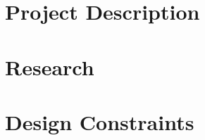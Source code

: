 \documentclass[12pt]{article}
\begin{document}
\section{Project Description}                   %
\section{Research}                              %
\section{Design Constraints}                    %
\end{document}
